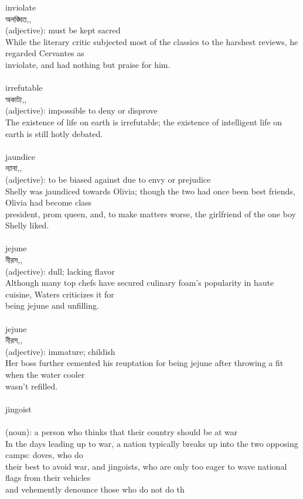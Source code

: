 \documentclass{article}
\begin{document}
{{inviolate}\\
{অলঙ্ঘিত,,}\\
{(adjective): must be kept sacred\\While the literary critic subjected most of the classics to the harshest reviews, he regarded Cervantes as\\inviolate, and had nothing but praise for him.\\}\\
{irrefutable}\\
{অকাট্য,,}\\
{(adjective): impossible to deny or disprove\\The existence of life on earth is irrefutable; the existence of intelligent life on earth is still hotly debated.\\}\\
{jaundice}\\
{ন্যাবা,,}\\
{(adjective): to be biased against due to envy or prejudice\\Shelly was jaundiced towards Olivia; though the two had once been best friends, Olivia had become class\\president, prom queen, and, to make matters worse, the girlfriend of the one boy Shelly liked.\\}\\
{jejune}\\
{নীরস,,}\\
{(adjective): dull; lacking flavor\\Although many top chefs have secured culinary foam's popularity in haute cuisine, Waters criticizes it for\\being jejune and unfilling.\\}\\
{jejune}\\
{নীরস,,}\\
{(adjective): immature; childish\\Her boss further cemented his reuptation for being jejune after throwing a fit when the water cooler\\wasn't refilled.\\}\\
{jingoist}\\
{}\\
{(noun): a person who thinks that their country should be at war\\In the days leading up to war, a nation typically breaks up into the two opposing camps: doves, who do\\their best to avoid war, and jingoists, who are only too eager to wave national flags from their vehicles\\and vehemently denounce those who do not do th\\}\\
}
\end{document}
